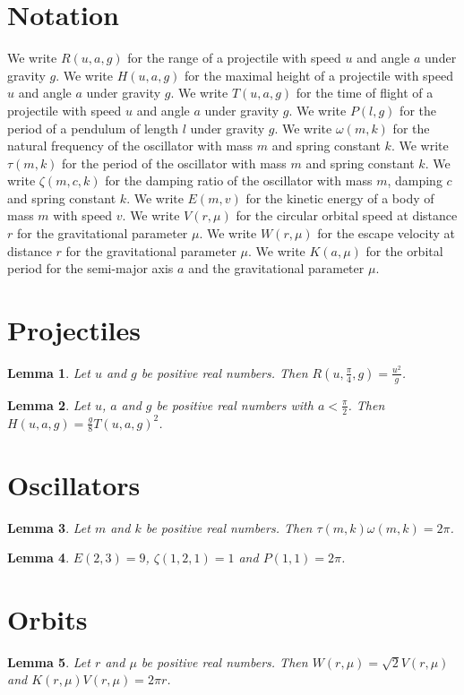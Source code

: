 \documentclass{article}
\newtheorem{lemma}{Lemma}
\begin{document}
\section{Notation}

We write $R(u,a,g)$ for the range of a projectile with speed $u$ and angle $a$ under gravity $g$.
We write $H(u,a,g)$ for the maximal height of a projectile with speed $u$ and angle $a$ under gravity $g$.
We write $T(u,a,g)$ for the time of flight of a projectile with speed $u$ and angle $a$ under gravity $g$.
We write $P(l,g)$ for the period of a pendulum of length $l$ under gravity $g$.
We write $\omega(m,k)$ for the natural frequency of the oscillator with mass $m$ and spring constant $k$.
We write $\tau(m,k)$ for the period of the oscillator with mass $m$ and spring constant $k$.
We write $\zeta(m,c,k)$ for the damping ratio of the oscillator with mass $m$, damping $c$ and spring constant $k$.
We write $E(m,v)$ for the kinetic energy of a body of mass $m$ with speed $v$.
We write $V(r,\mu)$ for the circular orbital speed at distance $r$ for the gravitational parameter $\mu$.
We write $W(r,\mu)$ for the escape velocity at distance $r$ for the gravitational parameter $\mu$.
We write $K(a,\mu)$ for the orbital period for the semi-major axis $a$ and the gravitational parameter $\mu$.

\section{Projectiles}

\begin{lemma}\label{range}
Let $u$ and $g$ be positive real numbers. Then $R(u,\frac{\pi}{4},g)=\frac{u^2}{g}$.
\end{lemma}

\begin{lemma}\label{height}
Let $u$, $a$ and $g$ be positive real numbers with $a<\frac{\pi}{2}$. Then $H(u,a,g)=\frac{g}{8}T(u,a,g)^2$.
\end{lemma}

\section{Oscillators}

\begin{lemma}\label{oscillator}
Let $m$ and $k$ be positive real numbers. Then $\tau(m,k)\omega(m,k)=2\pi$.
\end{lemma}

\begin{lemma}\label{values}
$E(2,3)=9$, $\zeta(1,2,1)=1$ and $P(1,1)=2\pi$.
\end{lemma}

\section{Orbits}

\begin{lemma}\label{orbits}
Let $r$ and $\mu$ be positive real numbers. Then $W(r,\mu)=\sqrt{2}V(r,\mu)$ and $K(r,\mu)V(r,\mu)=2\pi r$.
\end{lemma}
\end{document}
